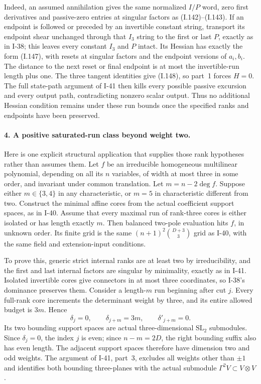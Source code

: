 Indeed, an assumed annihilation gives the same normalized
$I/P$ word, zero first derivatives and passive-zero entries
at singular factors as (I.142)--(I.143). If an endpoint is
followed or preceded by an invertible constant string, transport
its endpoint shear unchanged through that $I_3$ string to the
first or last $P$, exactly as in I-38; this leaves every
constant $I_3$ and $P$ intact. Its Hessian has exactly
the form (I.147), with resets at singular factors and the
endpoint versions of $a_i,b_i$. The distance to the next reset
or final endpoint is at most the invertible-run length plus
one. The three tangent identities give (I.148), so part~1
forces $H=0$. The full state-path argument of I-41 then kills
every possible passive excursion and every output path,
contradicting nonzero scalar output. Thus no additional
Hessian condition remains under these run bounds once the
specified ranks and endpoints have been preserved.

\paragraph{4. A positive saturated-run class beyond weight two.}
Here is one explicit structural application that supplies those
rank hypotheses rather than assumes them. Let $f$ be an
irreducible homogeneous multilinear polynomial, depending on
all its $n$ variables, of width at most three in some order,
and invariant under common translation. Let
$m=n-2\deg f$. Suppose either $m\in\{3,4\}$ in any
characteristic, or $m=5$ in characteristic different from two.
Construct the minimal affine cores from the actual coefficient
support spaces, as in I-40. Assume that every maximal run of
rank-three cores is either isolated or has length exactly $m$.
Then balanced two-pole evaluation hits $f$, in unknown order.
Its finite grid is the same
$(n+1)^2\binom{D+3}{3}$ grid as I-40, with the same field
and extension-input conditions.

To prove this, generic strict internal ranks are at least two
by irreducibility, and the first and last internal factors
are singular by minimality, exactly as in I-41. Isolated
invertible cores give connectors in at most three coordinates,
so I-38's dominance preserves them. Consider a length-$m$
run beginning after cut $j$. Every full-rank core increments
the determinant weight by three, and its entire allowed
budget is $3m$. Hence
\[
 \delta_j=0,\qquad\delta_{j+m}=3m,
 \qquad\delta'_{j+m}=0.
 \tag{I.154}
\]
Its two bounding support spaces are actual three-dimensional
$\mathrm{SL}_2$ submodules. Since $\delta_j=0$, the index
$j$ is even; since $n-m=2D$, the right bounding suffix also
has even length. The adjacent support spaces therefore have
dimension two and odd weights. The argument of I-41,
part~3, excludes all weights other than $\pm1$ and identifies
both bounding three-planes with the actual submodule
$\Gamma^2V\subset V\otimes V$.

